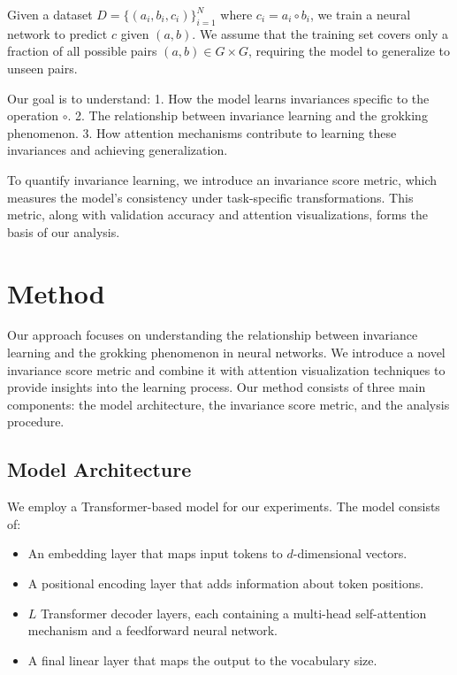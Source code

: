 \documentclass{article} %
\begin{document}
Given a dataset $D = \{(a_i, b_i, c_i)\}_{i=1}^{N}$ where $c_i = a_i \circ b_i$, we train a neural network to predict $c$ given $(a,b)$. We assume that the training set covers only a fraction of all possible pairs $(a,b) \in G \times G$, requiring the model to generalize to unseen pairs.

Our goal is to understand:
1. How the model learns invariances specific to the operation $\circ$.
2. The relationship between invariance learning and the grokking phenomenon.
3. How attention mechanisms contribute to learning these invariances and achieving generalization.

To quantify invariance learning, we introduce an invariance score metric, which measures the model's consistency under task-specific transformations. This metric, along with validation accuracy and attention visualizations, forms the basis of our analysis.

\section{Method}
\label{sec:method}

Our approach focuses on understanding the relationship between invariance learning and the grokking phenomenon in neural networks. We introduce a novel invariance score metric and combine it with attention visualization techniques to provide insights into the learning process. Our method consists of three main components: the model architecture, the invariance score metric, and the analysis procedure.

\subsection{Model Architecture}
We employ a Transformer-based model \citep{vaswani2017attention} for our experiments. The model consists of:

\begin{itemize}
    \item An embedding layer that maps input tokens to $d$-dimensional vectors.
    \item A positional encoding layer that adds information about token positions.
    \item $L$ Transformer decoder layers, each containing a multi-head self-attention mechanism and a feedforward neural network.
    \item A final linear layer that maps the output to the vocabulary size.
\end{itemize}
\end{document}
